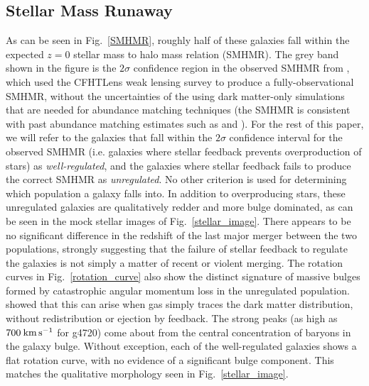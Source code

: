 \subsection{Stellar Mass Runaway}
As can be seen in Fig.~\ref{SMHMR}, roughly half of these galaxies fall within
the expected $z=0$ stellar mass to halo mass relation (SMHMR).  The grey band
shown in the figure is the $2\sigma$ confidence region in the observed SMHMR
from \citet{Hudson2015}, which used the CFHTLens weak lensing survey to produce
a fully-observational SMHMR, without the uncertainties of the using dark
matter-only simulations that are needed for abundance matching techniques (the
\citet{Hudson2015} SMHMR is consistent with past abundance matching estimates
such as \citet{Behroozi2013} and \citet{Moster2013}).  For the rest of this
paper, we will refer to the galaxies that fall within the $2\sigma$ confidence
interval for the observed SMHMR (i.e. galaxies where stellar feedback prevents
overproduction of stars) as {\it well-regulated}, and the galaxies where stellar
feedback fails to produce the correct SMHMR as {\it unregulated}.  No other
criterion is used for determining which population a galaxy falls into. In
addition to overproducing stars, these unregulated galaxies are qualitatively
redder and more bulge dominated, as can be seen in the mock stellar images of
Fig.~\ref{stellar_image}.  There appears to be no significant difference in
the redshift of the last major merger between the two populations, strongly
suggesting that the failure of stellar feedback to regulate the galaxies is not
simply a matter of recent or violent merging.  The rotation curves in
Fig.~\ref{rotation_curve} also show the distinct signature of massive bulges
formed by catastrophic angular momentum loss in the unregulated population.
\citet{vanDenBosch2001} showed that this can arise when gas simply traces the
dark matter distribution, without redistribution or ejection by feedback.  The
strong peaks (as high as $700\>{\rm km}\,{\rm s}^{-1}$ for g4720) come about from the central
concentration of baryons in the galaxy bulge.  Without exception, each of the
well-regulated galaxies shows a flat rotation curve, with no evidence of a
significant bulge component.  This matches the qualitative morphology seen in
Fig.~\ref{stellar_image}.

